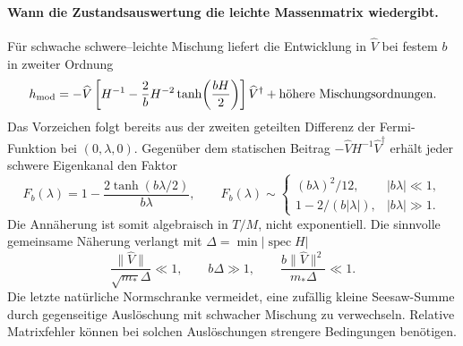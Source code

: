 \paragraph{Wann die Zustandsauswertung die leichte Massenmatrix wiedergibt.}
Für schwache schwere--leichte Mischung liefert die Entwicklung in
$\widehat V$ bei festem $b$ in zweiter Ordnung
\begin{equation}\label{eq:sourcekmsfilter}
h_{\rm mod}=
-\widehat V\left[H^{-1}
-\frac2bH^{-2}\tanh\!\left(\frac{bH}{2}\right)\right]\widehat V^\dagger
+\text{höhere Mischungsordnungen}.
\end{equation}
Das Vorzeichen folgt bereits aus der zweiten geteilten Differenz
der Fermi-Funktion bei $(0,\lambda,0)$.
Gegenüber dem statischen Beitrag
$-\widehat V H^{-1}\widehat V^\dagger$ erhält jeder schwere Eigenkanal
den Faktor
\begin{equation}
F_b(\lambda)=1-\frac{2\tanh(b\lambda/2)}{b\lambda},\qquad
F_b(\lambda)\sim
\begin{cases}
(b\lambda)^2/12,& |b\lambda|\ll1,\\
1-2/(b|\lambda|),& |b\lambda|\gg1.
\end{cases}
\end{equation}
Die Annäherung ist somit algebraisch in $T/M$, nicht exponentiell.
Die sinnvolle gemeinsame Näherung verlangt mit
$\Delta=\min|\operatorname{spec}H|$
\begin{equation}\label{eq:kmswindow}
\frac{\|\widehat V\|}{\sqrt{m_*}\Delta}\ll1,\qquad
b\Delta\gg1,\qquad
\frac{b\|\widehat V\|^2}{m_*\Delta}\ll1.
\end{equation}
Die letzte natürliche Normschranke vermeidet, eine zufällig kleine
Seesaw-Summe durch gegenseitige Auslöschung mit schwacher Mischung zu
verwechseln. Relative Matrixfehler können bei solchen Auslöschungen
strengere Bedingungen benötigen.

